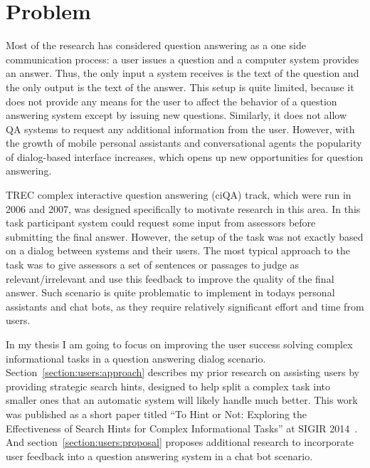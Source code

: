 %

\label{chapter:users}

\noindent

\section{Problem}
\label{section:users:problem}

Most of the research has considered question answering as a one side communication process: a user issues a question and a computer system provides an answer.
Thus, the only input a system receives is the text of the question and the only output is the text of the answer.
This setup is quite limited, because it does not provide any means for the user to affect the behavior of a question answering system except by issuing new questions.
Similarly, it does not allow QA systems to request any additional information from the user.
However, with the growth of mobile personal assistants and conversational agents the popularity of dialog-based interface increases, which opens up new opportunities for question answering.

TREC complex interactive question answering (ciQA) track, which were run in 2006 and 2007, was designed specifically to motivate research in this area.
In this task participant system could request some input from assessors before submitting the final answer.
However, the setup of the task was not exactly based on a dialog between systems and their users.
The most typical approach to the task was to give assessors a set of sentences or passages to judge as relevant/irrelevant and use this feedback to improve the quality of the final answer.
Such scenario is quite problematic to implement in todays personal assistants and chat bots, as they require relatively significant effort and time from users.

In my thesis I am going to focus on improving the user success solving complex informational tasks in a question answering dialog scenario.
Section~\ref{section:users:approach} describes my prior research on assisting users by providing strategic search hints, designed to help split a complex task into smaller ones that an automatic system will likely handle much better.
This work was published as a short paper titled ``To Hint or Not: Exploring the Effectiveness of Search Hints for Complex Informational Tasks'' at SIGIR 2014~\cite{savenkov2014hint}.
And section~\ref{section:users:proposal} proposes additional research to incorporate user feedback into a question answering system in a chat bot scenario.

